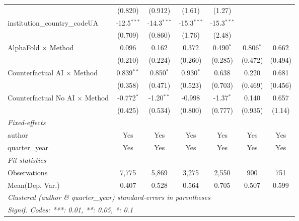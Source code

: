 \begin{tabular}{lcccccc}
                                         & (0.820)       & (0.912)       & (1.61)        & (1.27)        &               &   \\   
   institution\_country\_codeUA          & -12.5$^{***}$ & -14.3$^{***}$ & -15.3$^{***}$ & -15.3$^{***}$ &               &   \\   
                                         & (0.709)       & (0.860)       & (1.76)        & (2.48)        &               &   \\   
   AlphaFold $\times$ Method             & 0.096         & 0.162         & 0.372         & 0.490$^{*}$   & 0.806$^{*}$   & 0.662\\   
                                         & (0.210)       & (0.224)       & (0.260)       & (0.285)       & (0.472)       & (0.494)\\   
   Counterfactual AI $\times$ Method     & 0.839$^{**}$  & 0.850$^{*}$   & 0.930$^{*}$   & 0.638         & 0.220         & 0.681\\   
                                         & (0.358)       & (0.471)       & (0.523)       & (0.703)       & (0.469)       & (0.456)\\   
   Counterfactual No AI $\times$ Method  & -0.772$^{*}$  & -1.20$^{**}$  & -0.998        & -1.37$^{*}$   & 0.140         & 0.657\\   
                                         & (0.425)       & (0.534)       & (0.800)       & (0.777)       & (0.935)       & (1.14)\\   
   \midrule
   \emph{Fixed-effects}\\
   author                                & Yes           & Yes           & Yes           & Yes           & Yes           & Yes\\  
   quarter\_year                         & Yes           & Yes           & Yes           & Yes           & Yes           & Yes\\  
   \midrule
   \emph{Fit statistics}\\
   Observations                          & 7,775         & 5,869         & 3,275         & 2,550         & 900           & 751\\  
Mean(Dep. Var.) & 0.407 & 0.528 & 0.564 & 0.705 & 0.507 & 0.599 \\
   \midrule \midrule
   \multicolumn{7}{l}{\emph{Clustered (author \& quarter\_year) standard-errors in parentheses}}\\
   \multicolumn{7}{l}{\emph{Signif. Codes: ***: 0.01, **: 0.05, *: 0.1}}\\
\end{tabular}
\par\endgroup
